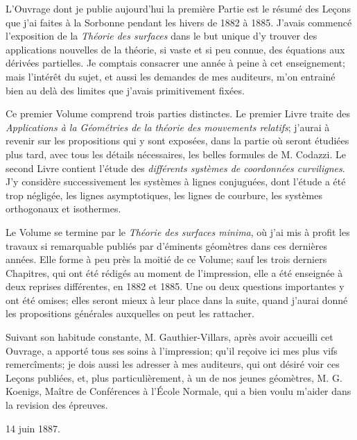 

L'Ouvrage dont je publie aujourd'hui la première Partie est le résumé des Leçons que j'ai faites à la Sorbonne pendant 
les hivers de 1882 à 1885. J'avais commencé l'exposition de la \textit{Théorie des surfaces} dans le but unique d'y 
trouver des applications nouvelles de la théorie, si vaste et si peu connue, des équations aux dérivées partielles. Je 
comptais consacrer une année à peine à cet enseignement; mais l'intérêt du sujet, et aussi les demandes de mes 
auditeurs, m'on entrainé bien au delà des limites que j'avais primitivement fixées.

Ce premier Volume comprend trois parties distinctes. Le premier Livre traite des \textit{Applications à la Géométries 
de la théorie des mouvements relatifs}; j'aurai à revenir sur les propositions qui y sont exposées, dans la partie où 
seront étudiées plus tard, avec tous les détails nécessaires, les belles formules de M. Codazzi. Le second Livre 
contient l'étude des \textit{différents systèmes de coordonnées curvilignes}. J'y considère successivement les systèmes 
à lignes conjuguées, dont l'étude a été trop négligée, les lignes asymptotiques, les lignes de courbure, les systèmes 
orthogonaux et isothermes.

Le Volume se termine par le \textit{Théorie des surfaces minima}, où j'ai mis à profit les travaux si remarquable 
publiés par d'éminents géomètres dans ces dernières années. Elle forme à peu près la moitié de ce Volume; sauf les 
trois 
derniers Chapitres, qui ont été rédigés au moment de l'impression, elle a été enseignée à deux reprises différentes, en 
1882 et 1885. Une ou deux questions importantes y ont été omises; elles seront mieux à leur place dans la suite, quand 
j'aurai donné les propositions générales auxquelles on peut les rattacher.

Suivant son habitude constante, M. Gauthier-Villars, après avoir accueilli cet Ouvrage, a apporté tous ses soins à 
l'impression; qu'il reçoive ici mes plus vifs remercîments; je dois aussi les adresser à mes auditeurs, qui ont désiré 
voir ces Leçons publiées, et, plus particulièrement, à un de nos jeunes géomètres, M. G. Koenigs, Maître de Conférences 
à l'École Normale, qui a bien voulu m'aider dans la revision des épreuves.

\begin{flushright}
  {\small{14 juin 1887.}}
\end{flushright}
